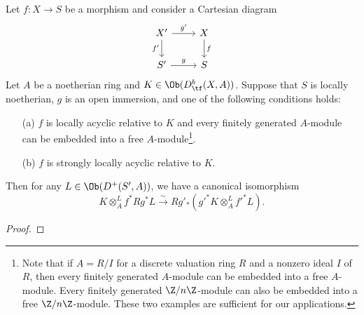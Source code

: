 \begin{proposition}\label{scheme locally ayclic morphism base change by open immersion isomorphism}
Let $f:X\to S$ be a morphism and consider a Cartesian diagram
\[\begin{tikzcd}
X'\ar[r,"g'"]\ar[d,swap,"f'"]&X\ar[d,"f"]\\
S'\ar[r,"g"]&S
\end{tikzcd}\]
Let $A$ be a noetherian ring and $K\in\Ob(D^b_{\tf}(X,A))$. Suppose that $S$ is locally noetherian, $g$ is an open immersion, and one of the following conditions holds:
\begin{enumerate}
    \item[(a)] $f$ is locally acyclic relative to $K$ and every finitely generated $A$-module can be embedded into a free $A$-module\footnote{Note that if $A=R/I$ for a discrete valuation ring $R$ and a nonzero ideal $I$ of $R$, then every finitely generated $A$-module can be embedded into a free $A$-module. Every finitely generated $\Z/n\Z$-module can also be embedded into a free $\Z/n\Z$-module. These two examples are sufficient for our applications.}.
    \item[(b)] $f$ is strongly locally acyclic relative to $K$.
\end{enumerate}
Then for any $L\in\Ob(D^+(S',A))$, we have a canonical isomorphism
\[K\otimes_A^Lf^*Rg^*L\stackrel{\sim}{\to} Rg'_*(g'^*K\otimes_A^Lf'^*L).\]
\end{proposition}
\begin{proof}

\end{proof}


